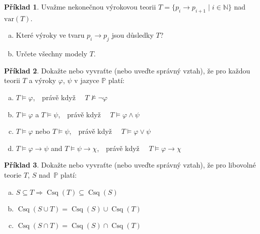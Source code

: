 \documentclass[a4paper]{article}
\theoremstyle{definition}
\newtheorem{problem}{Příklad}
\DeclareMathOperator{\Conseq}{Csq}
\begin{document}
    
\medskip\begin{problem}
Uvažme nekonečnou výrokovou teorii $T=\{p_i \to p_{i+1}\mid i\in \mathbb{N}\}$ nad $\mathrm{var}(T)$. 
\begin{enumerate}[(a)]
    \item Které výroky ve tvaru  $p_i \to p_j$ jsou důsledky $T$?
    \item Určete všechny modely $T$.
\end{enumerate}
\end{problem}


\medskip\begin{problem}
Dokažte nebo vyvraťte (nebo uveďte správný vztah), že pro každou teorii $T$ a výroky $\varphi$, $\psi$ v jazyce $\mathbb{P}$ platí:
\begin{enumerate}[(a)]
    \item $T \models \varphi$,\ \  právě když \ \ $T \not\models \neg \varphi$
    \item $T \models \varphi$ a $T \models \psi$,\ \ právě když \ \ $T \models \varphi \wedge \psi$
    \item $T \models \varphi$ nebo $T \models \psi$,\ \ právě když \ \ $T \models \varphi \vee \psi$
    \item $T \models \varphi \to \psi$ and $T \models \psi \to \chi$,\ \ právě když \ \ $T \models \varphi \to \chi$
\end{enumerate}
\end{problem}
    

\medskip\begin{problem}
Dokažte nebo vyvraťte (nebo uveďte správný vztah), že pro libovolné teorie $T$, $S$ nad~$\mathbb{P}$ platí:
\begin{enumerate}[(a)]
    \item $S\subseteq T \Rightarrow \Conseq(T) \subseteq \Conseq(S)$
    \item $\Conseq(S\cup T)=\Conseq(S) \cup \Conseq(T)$
    \item $\Conseq(S\cap T)=\Conseq(S) \cap \Conseq(T)$
\end{enumerate}
\end{problem}
\end{document}
